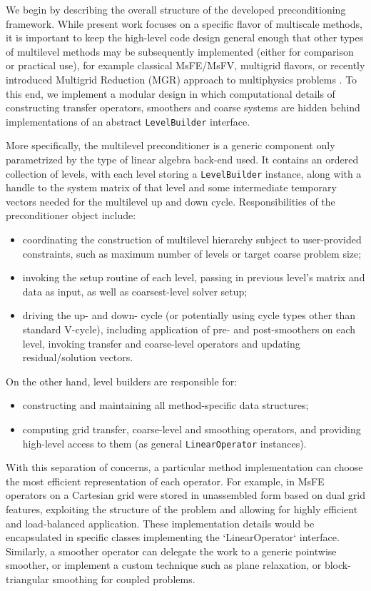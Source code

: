 We begin by describing the overall structure of the developed preconditioning framework.   While present work focuses on a specific flavor of multiscale methods, it is important to keep the high-level code design general enough that other types of multilevel methods may be subsequently implemented (either for comparison or practical use), for example classical MsFE/MsFV, multigrid flavors, or recently introduced Multigrid Reduction (MGR) approach to multiphysics problems \cite{Bui2020}.   To this end, we implement a modular design in which computational details of constructing transfer operators, smoothers and coarse systems are hidden behind implementations of an abstract \texttt{LevelBuilder} interface.

More specifically, the multilevel preconditioner is a generic component only parametrized by the type of linear algebra back-end used.   It contains an ordered collection of levels, with each level storing a \texttt{LevelBuilder} instance, along with a handle to the system matrix of that level and some intermediate temporary vectors needed for the multilevel up and down cycle.   Responsibilities of the preconditioner object include:
\begin{itemize}
    \item coordinating the construction of multilevel hierarchy subject to user-provided constraints, such as maximum number of levels or target coarse problem size;
    \item invoking the setup routine of each level, passing in previous level's matrix and data as input, as well as coarsest-level solver setup;
    \item driving the up- and down- cycle (or potentially using cycle types other than standard V-cycle), including application of pre- and post-smoothers on each level, invoking transfer and coarse-level operators and updating residual/solution vectors.
\end{itemize}
On the other hand, level builders are responsible for:
\begin{itemize}
    \item constructing and maintaining all method-specific data structures;
    \item computing grid transfer, coarse-level and smoothing operators, and providing high-level access to them (as general \texttt{LinearOperator} instances).
\end{itemize}
With this separation of concerns, a particular method implementation can choose the most efficient representation of each operator.   For example, in \cite{Manea2015,Manea2016} MsFE operators on a Cartesian grid were stored in unassembled form based on dual grid features, exploiting the structure of the problem and allowing for highly efficient and load-balanced application.   These implementation details would be encapsulated in specific classes implementing the `LinearOperator` interface.   Similarly, a smoother operator can delegate the work to a generic pointwise smoother, or implement a custom technique such as plane relaxation, or block-triangular smoothing for coupled problems.

